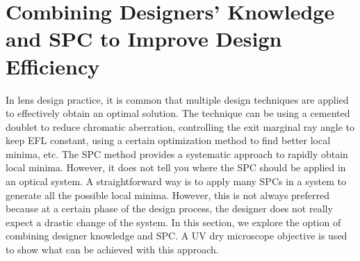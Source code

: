\newpage
\section{Combining Designers' Knowledge and SPC to Improve Design Efficiency}
In lens design practice, it is common that multiple design techniques are applied to effectively obtain an optimal solution. The technique can be using a cemented doublet to reduce chromatic aberration, controlling the exit marginal ray angle to keep EFL constant, using a certain optimization method to find better local minima, etc. The SPC method provides a systematic approach to rapidly obtain local minima. However, it does not tell you where the SPC should be applied in an optical system. A straightforward way is to apply many SPCs in a system to generate all the possible local minima. However, this is not always preferred because at a certain phase of the design process, the designer does not really expect a drastic change of the system. In this section, we explore the option of combining designer knowledge and SPC. A UV dry microscope objective is used to show what can be achieved with this approach. 

